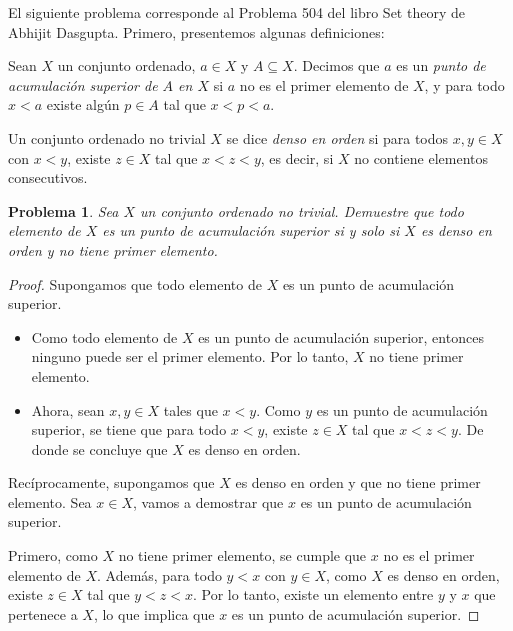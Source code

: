 \documentclass[a4,10pt]{aleph-notas}
\newtheorem*{prob}{Problema}
\begin{document}
\encabezado

\noindent
El siguiente problema corresponde al Problema 504 del libro Set theory de Abhijit Dasgupta. Primero, presentemos algunas definiciones:

\begin{defi}
Sean $X$ un conjunto ordenado, $a \in X$ y  $A \subseteq X$.
Decimos que $a$ es un \textit{punto de acumulación superior de $A$ en $X$} si $a$ no es el primer elemento de $X$, y para todo $x < a$ existe algún $p \in A$ tal que $x < p < a$. 
\end{defi}

\begin{defi}
Un conjunto ordenado no trivial $X$ se dice \textit{denso en orden} si para todos $x, y \in X$ con $x < y$, existe $z \in X$ tal que $x < z < y$, es decir, si $X$ no contiene elementos consecutivos.
\end{defi}

\begin{prob}
    Sea $X$ un conjunto ordenado no trivial. Demuestre que todo elemento de $X$ es un punto de acumulación superior si y solo si $X$ es denso en orden y no tiene primer elemento.
\end{prob}

\begin{proof}
Supongamos que todo elemento de $X$ es un punto de acumulación superior.

\begin{itemize}
    \item Como todo elemento de $X$ es un punto de acumulación superior, entonces ninguno puede ser el primer elemento. Por lo tanto, $X$ no tiene primer elemento.

    \item Ahora, sean $x, y \in X$ tales que $x < y$. Como $y$ es un punto de acumulación superior, se tiene que para todo $x < y$, existe $z \in X$ tal que $x < z < y$. De donde se concluye que $X$ es denso en orden.
\end{itemize}

Recíprocamente, supongamos que $X$ es denso en orden y que no tiene primer elemento. Sea $x \in X$, vamos a demostrar que $x$ es un punto de acumulación superior.

Primero, como $X$ no tiene primer elemento, se cumple que $x$ no es el primer elemento de $X$. Además, para todo $y < x$ con $y \in X$, como $X$ es denso en orden, existe $z \in X$ tal que $y < z < x$. Por lo tanto, existe un elemento entre $y$ y $x$ que pertenece a $X$, lo que implica que $x$ es un punto de acumulación superior.
\end{proof}
\end{document}
